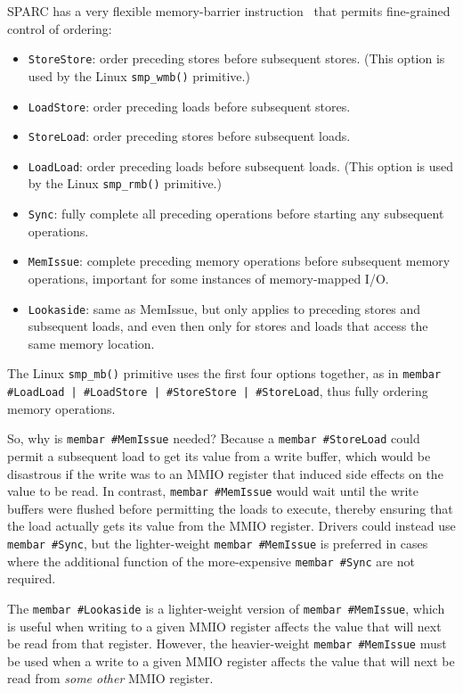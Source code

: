 SPARC has a very flexible memory-barrier instruction~\cite{SPARC94}
that permits fine-grained control of ordering:
\begin{itemize}
\item	{\tt StoreStore}: order preceding stores before subsequent stores.
	(This option is used by the Linux {\tt smp\_wmb()} primitive.)
\item	{\tt LoadStore}: order preceding loads before subsequent stores.
\item	{\tt StoreLoad}: order preceding stores before subsequent loads.
\item	{\tt LoadLoad}: order preceding loads before subsequent loads.
	(This option is used by the Linux {\tt smp\_rmb()} primitive.)
\item	{\tt Sync}: fully complete all preceding operations before starting
	any subsequent operations.
\item	{\tt MemIssue}: complete preceding memory operations before subsequent
	memory operations, important for some instances of memory-mapped
	I/O.
\item	{\tt Lookaside}: same as MemIssue, but only applies to preceding stores
	and subsequent loads, and even then only for stores and loads that
	access the same memory location.
\end{itemize}

The Linux {\tt smp\_mb()} primitive uses the first four options together,
as in
{\tt membar \#LoadLoad | \#LoadStore | \#StoreStore | \#StoreLoad},
thus fully ordering memory operations.

So, why is {\tt membar \#MemIssue} needed?
Because a {\tt membar \#StoreLoad} could permit a subsequent
load to get its value from a write buffer, which would be
disastrous if the write was to an MMIO register that induced side effects
on the value to be read.
In contrast, {\tt membar \#MemIssue} would wait until the write buffers
were flushed before permitting the loads to execute,
thereby ensuring that the load actually gets its value from the MMIO register.
Drivers could instead use {\tt membar \#Sync}, but the lighter-weight
{\tt membar \#MemIssue} is preferred in cases where the additional function
of the more-expensive {\tt membar \#Sync} are not required.

The {\tt membar \#Lookaside} is a lighter-weight version of
{\tt membar \#MemIssue}, which is useful when writing to a given MMIO register
affects the value that will next be read from that register.
However, the heavier-weight {\tt membar \#MemIssue} must be used when
a write to a given MMIO register affects the value that will next be
read from {\em some other} MMIO register.

